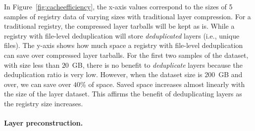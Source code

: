 In Figure~\ref{fig:cacheefficiency}, the x-axis values correspond to the sizes of 5 samples of registry data of varying sizes with traditional layer compression. For a traditional registry, the compressed layer tarballs will be kept as is.
While a registry with file-level deduplication will store \emph{deduplicated} layers (i.e., unique files). 
The y-axis shows how much space a registry with file-level deduplication can save over compressed layer tarballs.
For the first two samples of the dataset, with size less than $20$~GB, 
there is no benefit to \emph{deduplicate} layers because the deduplication ratio is very low.
However, when the dataset size is $200$~GB and over, we can save over $40$\% of space. Saved space increases almost linearly with the size of the layer dataset.
This affirms the benefit of deduplicating layers as the registry size increases.

\paragraph{Layer preconstruction.}
%
%



